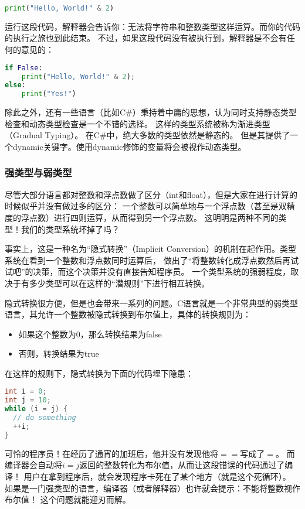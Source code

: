 \documentclass[../main.tex]{subfiles}
\begin{document}
\begin{lstlisting}[language=python]
print("Hello, World!" & 2)
\end{lstlisting}

  运行这段代码，解释器会告诉你：无法将字符串和整数类型这样运算。而你的代码的执行之旅也到此结束。
  不过，如果这段代码没有被执行到，解释器是不会有任何的意见的：

\begin{lstlisting}[language=python]
if False:
	print("Hello, World!" & 2);
else:
	print("Yes!")
\end{lstlisting}

  \indent 除此之外，还有一些语言（比如C\#）秉持着中庸的思想，认为同时支持静态类型检查和动态类型检查是一个不错的选择。
  这样的类型系统被称为渐进类型（Gradual Typing）。 \cite{gradualwiki} 在C\#中，绝大多数的类型依然是静态的。
  但是其提供了一个dynamic关键字。使用dynamic修饰的变量将会被视作动态类型。

  \subsubsection*{强类型与弱类型}
  \indent 尽管大部分语言都对整数和浮点数做了区分（int和float），但是大家在进行计算的时候似乎并没有做过多的区分：
  一个整数可以简单地与一个浮点数（甚至是双精度的浮点数）进行四则运算，从而得到另一个浮点数。
  这明明是两种不同的类型！我们的类型系统坏掉了吗？

  \indent 事实上，这是一种名为“隐式转换”（Implicit Conversion）的机制在起作用。类型系统在看到一个整数和浮点数同时运算后，
  做出了“将整数转化成浮点数然后再试试吧”的决策，而这个决策并没有直接告知程序员。
  一个类型系统的强弱程度，取决于有多少类型可以在这样的“潜规则”下进行相互转换。

  \indent 隐式转换很方便，但是也会带来一系列的问题。C语言就是一个非常典型的弱类型语言，其允许一个整数被隐式转换到布尔值上，具体的转换规则为：
  \begin{itemize}
    \item 如果这个整数为0，那么转换结果为false
    \item 否则，转换结果为true
  \end{itemize}

  \indent 在这样的规则下，隐式转换为下面的代码埋下隐患：

\begin{lstlisting}[language=c]
int i = 0;
int j = 10;
while (i = j) {
  // do something
  ++i;
}
\end{lstlisting}

  \indent 可怜的程序员！在经历了通宵的加班后，他并没有发现他将$==$写成了$=$。
  而编译器会自动将$i = j$返回的整数转化为布尔值，从而让这段错误的代码通过了编译！
  用户在拿到程序后，就会发现程序卡死在了某个地方（就是这个死循环）。
  如果是一门强类型的语言，编译器（或者解释器）也许就会提示：不能将整数视作布尔值！
  这个问题就能迎刃而解。
\end{document}
